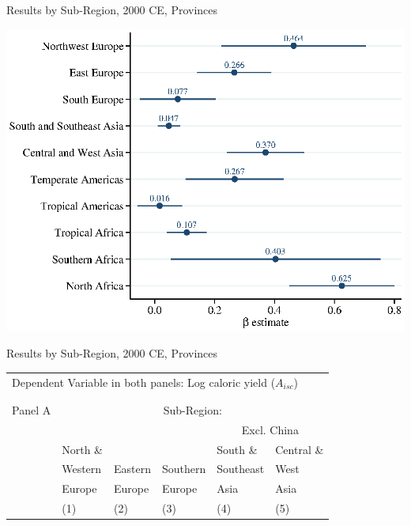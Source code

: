 \documentclass[10pt, xcolor=dvipsnames]{beamer}
\begin{document}
\begin{frame}{Results by Sub-Region, 2000 CE, Provinces}\label{regprov}
\begin{center}
\includegraphics[width=.8\textwidth]{fig_coef_subregion_province.eps}
\end{center}
\hfill \hyperlink{robustness}{}
\end{frame}

\begin{frame}{Results by Sub-Region, 2000 CE, Provinces}

{\scriptsize
\begin{tabularx}{\textwidth}{lXXXXX}
\midrule
\multicolumn{6}{l}{Dependent Variable in both panels: Log caloric yield ($A_{isc}$)} \\ \\
\\
Panel A & \multicolumn{5}{c}{Sub-Region:} \\ \cmidrule{2-6}
 &          &         &             &  \multicolumn{2}{c}{Excl. China} \\ \cmidrule(lr){5-6}
 & North \& &         &              & South \&  & Central \&             \\
 & Western  & Eastern & Southern     & Southeast & West        \\
 & Europe   & Europe  & Europe       & Asia      & Asia      \\
 & (1) & (2) & (3) & (4) & (5) \\
\midrule

\midrule
\end{tabularx}
}

\hfill \hyperlink{robustness}{}
\end{frame}
\end{document}
